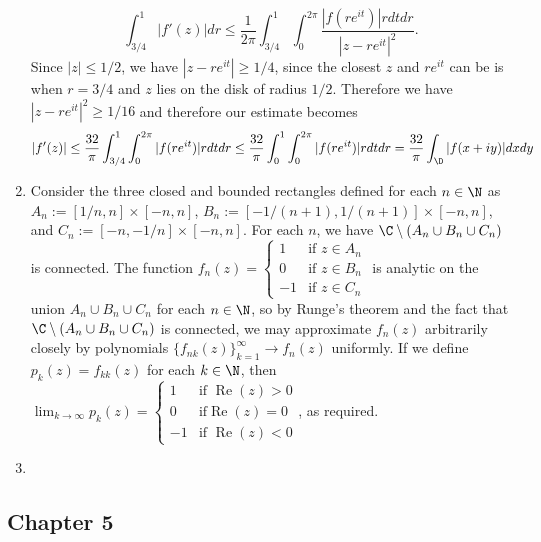 \documentclass[11pt]{book}
\theoremstyle{definition}
\renewcommand{\Re}{\operatorname{Re}}
\begin{document}
\begin{enumerate}
\[
 \int_{3/4}^1|f'(z)|dr \leq \dfrac{1}{2\pi} \int_{3/4}^1\int_0^{2\pi} \dfrac{|f(re^{it})|rdtdr}{|z-re^{it}|^2}.
\]
Since $|z|\leq1/2$, we have $|z-re^{it}|\geq 1/4$, since the closest $z$ and $re^{it}$ can be is when $r=3/4$ and $z$ lies on the disk of radius $1/2$. Therefore we have $|z-re^{it}|^2 \geq 1/16$ and therefore our estimate becomes
\[
 |f'(z)|\leq \dfrac{32}{\pi} \int_{3/4}^1\int_0^{2\pi} |f(re^{it})|rdtdr \leq \dfrac{32}{\pi}\int_0^1 \int_0^{2\pi} |f(re^{it})|rdtdr = \dfrac{32}{\pi}\int_{\D}|f(x+iy)|dxdy
\]
%
%
\item Consider the three closed and bounded rectangles defined for each $n\in \N$ as $A_n:=[1/n,n]\times[-n,n]$, $B_n:=[-1/(n+1),1/(n+1)]\times [-n,n]$, and $C_n:=[-n,-1/n]\times [-n,n]$. For each $n$, we have $\C\setminus(A_n\cup B_n\cup C_n)$ is connected. The function $f_n(z)=\begin{cases} 1 &\mbox{if } z\in A_n \\ 0 &\mbox{if } z\in B_n \\ -1 &\mbox{if } z\in C_n \end{cases}$ is analytic on the union $A_n\cup B_n\cup C_n$ for each $n\in\N$, so by Runge's theorem and the fact that $\C\setminus(A_n\cup B_n\cup C_n)$ is connected, we may approximate $f_n(z)$ arbitrarily closely by polynomials $\{f_{nk}(z)\}_{k=1}^\infty \to f_n(z)$ uniformly. If we define $p_k(z)=f_{kk}(z)$ for each $k\in \N$, then $\lim_{k\to\infty} p_k(z) = \begin{cases} 1 & \mbox{if } \Re(z)>0 \\ 0 & \mbox{if} \Re(z)=0 \\ -1 & \mbox{if } \Re(z) < 0 \end{cases}$, as required.
%
%
\item
\end{enumerate}
\subsection{Chapter 5}
\end{document}
